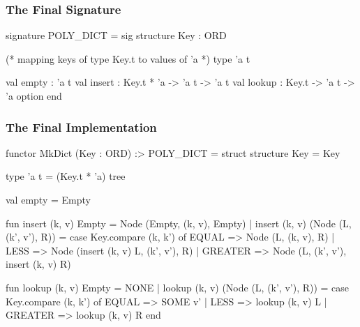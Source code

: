 \documentclass[aspectratio=169, handout]{beamer}
\begin{document}
\begin{frame}[fragile]
  \frametitle{The Final Signature}
  \begin{codeblock}
    signature POLY_DICT =
      sig
        structure Key : ORD

        (* mapping keys of type Key.t to values of 'a *)
        type 'a t

        val empty : 'a t
        val insert : Key.t * 'a -> 'a t -> 'a t
        val lookup : Key.t -> 'a t -> 'a option
      end
  \end{codeblock}
\end{frame}
\begin{frame}[fragile]
  \frametitle{The Final Implementation}

  \tiny
  \begin{codeblock}
    functor MkDict (Key : ORD) :> POLY_DICT =
      struct
        structure Key = Key

        type 'a t = (Key.t * 'a) tree

        val empty = Empty

        fun insert (k, v) Empty = Node (Empty, (k, v), Empty)
          | insert (k, v) (Node (L, (k', v'), R)) =
              case Key.compare (k, k') of
                EQUAL   => Node (L, (k, v), R)
              | LESS    => Node (insert (k, v) L, (k', v'), R)
              | GREATER => Node (L, (k', v'), insert (k, v) R)

        fun lookup (k, v) Empty = NONE
          | lookup (k, v) (Node (L, (k', v'), R)) =
              case Key.compare (k, k') of
                EQUAL   => SOME v'
              | LESS    => lookup (k, v) L
              | GREATER => lookup (k, v) R
      end
  \end{codeblock}
\end{frame}



\thankyou
\end{document}
